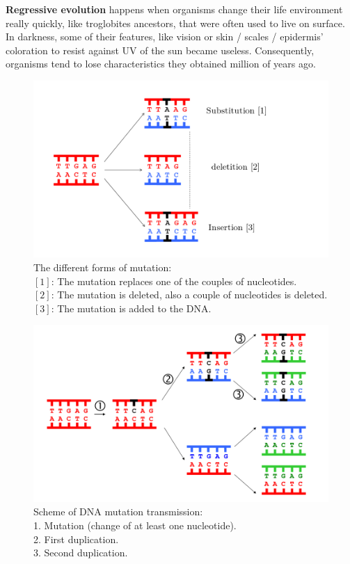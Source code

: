 \documentclass[draft, final]{report}
\begin{document}
\textbf{Regressive evolution} happens when organisms change their life environment really quickly, like troglobites ancestors, that were often used to live on surface. In darkness, some of their features, like vision or skin / scales / epidermis’ coloration to resist against UV of the sun became useless. Consequently, organisms tend to lose characteristics they obtained million of years ago. \\
\begin{figure}[!ht]
  \centering
  \includegraphics[scale=0.4]{LateX/Images/Evolution1bis.png}
  \caption{The different forms of mutation:
            \\ $[1]$: The mutation replaces one of the couples of nucleotides.
            \\ $[2]$: The mutation is deleted, also a couple of nucleotides is deleted.
            \\ $[3]$: The mutation is added to the DNA.\cite{raymondrodrigez}}
\end{figure}
\clearpage
\begin{figure}[!ht]
  \centering
  \includegraphics[scale=0.35]{LateX/Images/Mutation.png}
  \caption{Scheme of DNA mutation transmission:
            \\ 1. Mutation (change of at least one nucleotide).
            \\ 2. First duplication.
            \\ 3. Second duplication.\cite{raymondrodrigez2}}
\end{figure}
\end{document}
